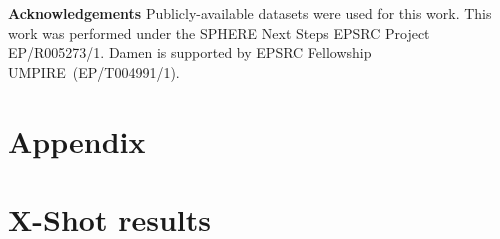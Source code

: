 \documentclass[final]{cvpr}
\begin{document}
\vspace{5pt}
{
\small
\noindent \textbf{Acknowledgements} Publicly-available datasets were used for this work. 
This work was performed under the SPHERE Next Steps EPSRC Project EP/R005273/1.
Damen is supported by EPSRC Fellowship UMPIRE~(EP/T004991/1).
}
{\small


}

\newpage


\appendix


\section*{Appendix}

\section{X-Shot results}
\end{document}
